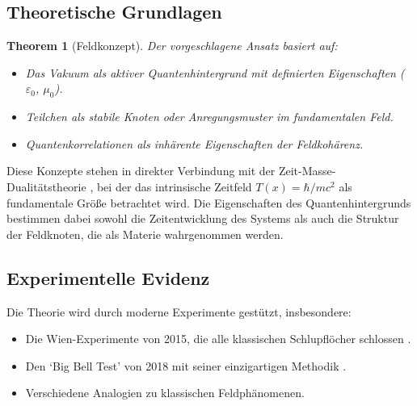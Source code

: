 \documentclass[12pt,a4paper]{article}
\newtheorem{theorem}{Theorem}[section]
\begin{document}
	\subsection{Theoretische Grundlagen}
	\begin{theorem}[Feldkonzept]
		Der vorgeschlagene Ansatz basiert auf:
		\begin{itemize}
			\item Das Vakuum als aktiver Quantenhintergrund mit definierten Eigenschaften (\(\varepsilon_0\), \(\mu_0\)).
			\item Teilchen als stabile Knoten oder Anregungsmuster im fundamentalen Feld.
			\item Quantenkorrelationen als inhärente Eigenschaften der Feldkohärenz.
		\end{itemize}
	\end{theorem}
	Diese Konzepte stehen in direkter Verbindung mit der Zeit-Masse-Dualitätstheorie \cite{Pascher2024}, bei der das intrinsische Zeitfeld \(T(x) = \hbar/mc^2\) als fundamentale Größe betrachtet wird. Die Eigenschaften des Quantenhintergrunds bestimmen dabei sowohl die Zeitentwicklung des Systems als auch die Struktur der Feldknoten, die als Materie wahrgenommen werden.
	
	\subsection{Experimentelle Evidenz}
	Die Theorie wird durch moderne Experimente gestützt, insbesondere:
	\begin{itemize}
		\item Die Wien-Experimente von 2015, die alle klassischen Schlupflöcher schlossen \cite{Giustina2015}.
		\item Den `Big Bell Test' von 2018 mit seiner einzigartigen Methodik \cite{BigBellTest2018}.
		\item Verschiedene Analogien zu klassischen Feldphänomenen.
	\end{itemize}
	
\end{document}
